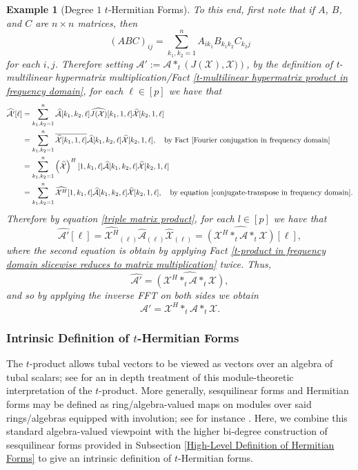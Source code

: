 \documentclass[11pt]{article}
\newtheorem{example}[theorem]{Example}
\begin{document}
\begin{example}[Degree $1$ $t$-Hermitian Forms]
    To this end, first note that if $A$, $B$, and $C$ are $n\times n$ matrices, then 
    \begin{equation}\label{triple matrix product}
        (ABC)_{ij} = \sum\limits_{k_1,k_2=1}^nA_{ik_1}B_{k_1k_2}C_{k_2j}
    \end{equation}
    for each $i,j$. Therefore setting $\mathcal{A}' := \mathcal{A}*_t\left(J(\mathcal{X}),\mathcal{X})\right)$, by the definition of t-multilinear hypermatrix multiplication/Fact \ref{t-multilinear hypermatrix product in frequency domain}, for each $\ell\in [p]$ we have that 
    \begin{align*}
        \widehat{\mathcal{A}'}[\ell] &= \sum\limits_{k_1,k_2=1}^n\widehat{\mathcal{A}}[k_1,k_2,\ell]\widehat{J(\mathcal{X})}[k_1,1,\ell]\widehat{\mathcal{X}}[k_2,1,\ell] \\
        &= \sum\limits_{k_1,k_2=1}^n\overline{\widehat{\mathcal{X}}[k_1,1,\ell]}\widehat{\mathcal{A}}[k_1,k_2,\ell]\widehat{\mathcal{X}}[k_2,1,\ell],\quad \text{by Fact }\eqref{Fourier conjugation in frequency domain} \\
        &= \sum\limits_{k_1,k_2=1}^n\left(\widehat{\mathcal{X}}\right)^H[1,k_1,\ell]\widehat{\mathcal{A}}[k_1,k_2,\ell]\widehat{\mathcal{X}}[k_2,1,\ell] \\
        &= \sum\limits_{k_1,k_2=1}^n\widehat{\mathcal{X}^H}[1,k_1,\ell]\widehat{\mathcal{A}}[k_1,k_2,\ell]\widehat{\mathcal{X}}[k_2,1,\ell],\quad \text{by equation }\eqref{conjugate-transpose in frequency domain}.
    \end{align*}
    Therefore by equation \eqref{triple matrix product}, for each $l\in [p]$ we have that
    \[\widehat{\mathcal{A}'}[\ell] = \widehat{\mathcal{X}^H}_{(\ell)}\widehat{\mathcal{A}}_{(\ell)}\widehat{\mathcal{X}}_{(\ell)} = \widehat{\left(\mathcal{X}^H*_t\mathcal{A}*_t\mathcal{X}\right)}[\ell],\]
    where the second equation is obtain by applying Fact \ref{t-product in frequency domain slicewise reduces to matrix multiplication} twice. 
    Thus, 
    \[\widehat{\mathcal{A}'} = \widehat{\left(\mathcal{X}^H*_t\mathcal{A}*_t\mathcal{X}\right)},\]
    and so by applying the inverse FFT on both sides we obtain 
    \[\mathcal{A}' = \mathcal{X}^H*_t\mathcal{A}*_t\mathcal{X}.\]
\end{example}

\subsubsection{Intrinsic Definition of $t$-Hermitian Forms}
The $t$-product allows tubal vectors to be viewed as vectors over an algebra of tubal scalars; see \cite{braman2010third,kilmer2013third} for an in depth treatment of this module-theoretic interpretation of the $t$-product. More generally, sesquilinear forms and Hermitian forms may be defined as ring/algebra-valued maps on modules over said rings/algebras equipped with involution; see for instance \cite{bayer2014sesquilinear}. Here, we combine this standard algebra-valued viewpoint with the higher bi-degree construction of sesquilinear forms provided in Subsection \ref{High-Level Definition of Hermitian Forms} to give an intrinsic definition of $t$-Hermitian forms. 
\end{document}
